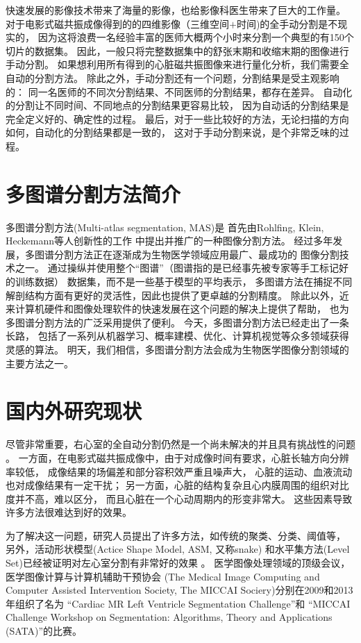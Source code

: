 快速发展的影像技术带来了海量的影像，也给影像科医生带来了巨大的工作量。
对于电影式磁共振成像得到的的四维影像（三维空间$+$时间)的全手动分割是不现实的，
因为这将浪费一名经验丰富的医师大概两个小时来分割一个典型的有150个切片的数据集。
因此，一般只将完整数据集中的舒张末期和收缩末期的图像进行手动分割。
如果想利用所有得到的心脏磁共振图像来进行量化分析，我们需要全自动的分割方法。
除此之外，手动分割还有一个问题，分割结果是受主观影响的：
同一名医师的不同次分割结果、不同医师的分割结果，都存在差异。
自动化的分割让不同时间、不同地点的分割结果更容易比较，
因为自动话的分割结果是完全定义好的、确定性的过程。
最后，对于一些比较好的方法，无论扫描的方向如何，自动化的分割结果都是一致的，
这对于手动分割来说，是个非常乏味的过程。


\section{多图谱分割方法简介}
多图谱分割方法(Multi-atlas segmentation, MAS)是
首先由Rohlfing, Klein, Heckemann等人创新性的工作
中提出并推广的一种图像分割方法。
经过多年发展，多图谱分割方法正在逐渐成为生物医学领域应用最广、最成功的
图像分割技术之一。
通过操纵并使用整个``图谱''（图谱指的是已经事先被专家等手工标记好的训练数据）
数据集，而不是一些基于模型的平均表示，
多图谱方法在捕捉不同解剖结构方面有更好的灵活性，因此也提供了更卓越的分割精度。
除此以外，近来计算机硬件和图像处理软件的快速发展在这个问题的解决上提供了帮助，
也为多图谱分割方法的广泛采用提供了便利。
今天，多图谱分割方法已经走出了一条长路，
包括了一系列从机器学习、概率建模、优化、计算机视觉等众多领域获得灵感的算法。
明天，我们相信，多图谱分割方法会成为生物医学图像分割领域的主要方法之一。


\section{国内外研究现状}

尽管非常重要，右心室的全自动分割仍然是一个尚未解决的并且具有挑战性的问题
。
一方面，在电影式磁共振成像中，由于对成像时间有要求，心脏长轴方向分辨率较低，
成像结果的场偏差和部分容积效严重且噪声大，
心脏的运动、血液流动也对成像结果有一定干扰；
另一方面，心脏的结构复杂且心内膜周围的组织对比度并不高，难以区分，
而且心脏在一个心动周期内的形变非常大。
这些因素导致许多方法很难达到好的效果。

为了解决这一问题，研究人员提出了许多方法，如传统的聚类、分类、阈值等，
另外，活动形状模型(Actice Shape Model, ASM, 又称snake)
和水平集方法(Level Set)已经被证明对左心室分割有非常好的效果
。
医学图像处理领域的顶级会议，医学图像计算与计算机辅助干预协会
(The Medical Image Computing and Computer Assisted Intervention Society,
The MICCAI Sociery)分别在2009和2013年组织了名为
``Cardiac MR Left Ventricle Segmentation Challenge''和
``MICCAI Challenge Workshop on Segmentation:
Algorithms, Theory and Applications (SATA)''的比赛。

